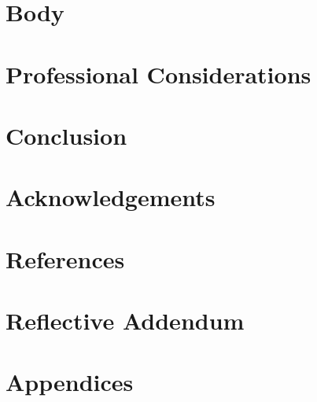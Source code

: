 \documentclass{article}
\begin{document}
\section{Body}

\section{Professional Considerations}

\section{Conclusion}

\section{Acknowledgements}

\section{References}

\section{Reflective Addendum}

\section{Appendices}

\medskip

\printbibliography
\end{document}
